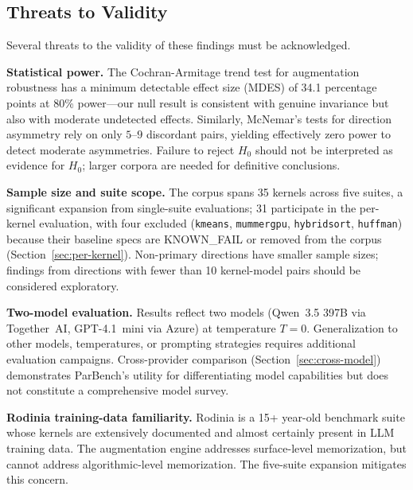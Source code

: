 \documentclass{article}
\begin{document}
\subsection{Threats to Validity}
\label{sec:threats}

Several threats to the validity of these findings must be acknowledged.

\textbf{Statistical power.}
The Cochran-Armitage trend test for augmentation robustness has
a minimum detectable effect size (MDES) of 34.1 percentage points
at 80\% power---our null result is consistent with genuine
invariance but also with moderate undetected effects.
Similarly, McNemar's tests for direction asymmetry rely on only
$5$--$9$ discordant pairs, yielding effectively zero power to
detect moderate asymmetries.
Failure to reject $H_0$ should not be interpreted as evidence
for $H_0$; larger corpora are needed for definitive conclusions.

\textbf{Sample size and suite scope.} The corpus spans 35 kernels across five suites, a significant expansion from single-suite evaluations; 31 participate in the per-kernel evaluation, with four excluded (\texttt{kmeans}, \texttt{mummergpu}, \texttt{hybridsort}, \texttt{huffman}) because their baseline specs are KNOWN\_FAIL or removed from the corpus (Section~\ref{sec:per-kernel}). Non-primary directions have smaller sample sizes; findings from directions with fewer than 10 kernel-model pairs should be considered exploratory.

\textbf{Two-model evaluation.}
Results reflect two models (Qwen~3.5 397B via Together~AI, GPT-4.1~mini via Azure) at temperature $T{=}0$. Generalization to other models, temperatures, or prompting strategies requires additional evaluation campaigns.
Cross-provider comparison (Section~\ref{sec:cross-model}) demonstrates ParBench's utility for differentiating model capabilities but does not constitute a comprehensive model survey. %

\textbf{Rodinia training-data familiarity.} Rodinia is a 15+ year-old benchmark suite whose kernels are extensively documented and almost certainly present in LLM training data. The augmentation engine addresses surface-level memorization, but cannot address algorithmic-level memorization. The five-suite expansion mitigates this concern.
\end{document}
